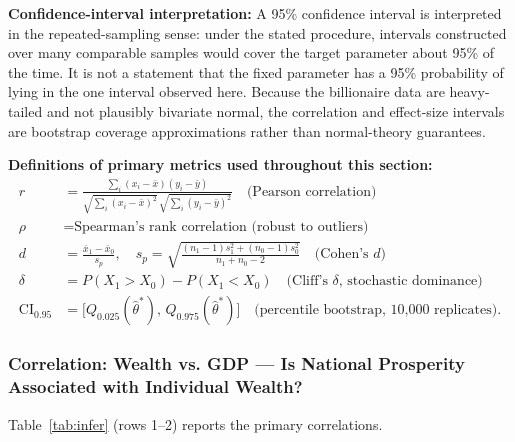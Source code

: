 \documentclass[a4paper,10pt]{article}
\begin{document}
\textbf{Confidence-interval interpretation:} A 95\% confidence interval is interpreted in the repeated-sampling sense: under the stated procedure, intervals constructed over many comparable samples would cover the target parameter about 95\% of the time. It is not a statement that the fixed parameter has a 95\% probability of lying in the one interval observed here. Because the billionaire data are heavy-tailed and not plausibly bivariate normal, the correlation and effect-size intervals are bootstrap coverage approximations rather than normal-theory guarantees.

\textbf{Definitions of primary metrics used throughout this section:}
\begin{align}
r &= \frac{\sum_i (x_i-\bar x)(y_i-\bar y)}{\sqrt{\sum_i (x_i-\bar x)^2}\,\sqrt{\sum_i (y_i-\bar y)^2}} \quad\text{(Pearson correlation)} \\[4pt]
\rho &= \text{Spearman's rank correlation (robust to outliers)} \\[4pt]
d &= \frac{\bar x_1 - \bar x_0}{s_p}, \quad
s_p = \sqrt{\frac{(n_1-1)s_1^2 + (n_0-1)s_0^2}{n_1+n_0-2}} \quad\text{(Cohen's $d$)} \\[4pt]
\delta &= P(X_1 > X_0) - P(X_1 < X_0) \quad\text{(Cliff's $\delta$, stochastic dominance)} \\[4pt]
\mathrm{CI}_{0.95} &= \bigl[Q_{0.025}(\hat\theta^*),\, Q_{0.975}(\hat\theta^*)\bigr] \quad\text{(percentile bootstrap, 10{,}000 replicates)}.
\end{align}

\subsubsection{Correlation: Wealth vs. GDP --- Is National Prosperity Associated with Individual Wealth?}

Table~\ref{tab:infer} (rows 1--2) reports the primary correlations.

\begin{landscape}
\begin{table}[H]
\centering
\caption{Inferential results: correlations and group comparisons with effect sizes and 95\% bootstrap CIs (10,000 replicates). Effect sizes with CIs that overlap the practical-significance threshold (gray band) should be interpreted as substantively small.}
\label{tab:infer}
\small

\end{table}
\end{landscape}
\end{document}
